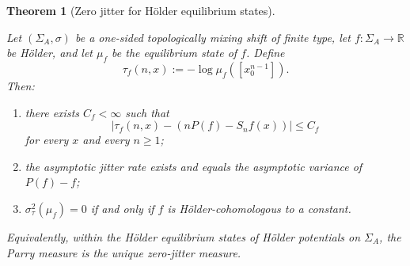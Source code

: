 \documentclass[pdflatex,sn-basic,Numbered]{sn-jnl}
\theoremstyle{thmstyleone}
\newtheorem{theorem}{Theorem}[section]
\theoremstyle{thmstyletwo}
\theoremstyle{thmstylethree}
\newcommand{\RR}{\mathbb{R}}
\newcommand{\leanverified}[1]{}
\begin{document}
\begin{theorem}[Zero jitter for H\"older equilibrium states]\label{thm:gibbs}
\leanverified{paper_zero_jitter_gibbs}
Let $(\Sigma_A,\sigma)$ be a one-sided topologically mixing shift of finite type, let $f:\Sigma_A\to\RR$ be H\"older, and let $\mu_f$ be the equilibrium state of $f$. Define
\[
\tau_f(n,x):=-\log\mu_f([x_0^{n-1}]).
\]
Then:
\begin{enumerate}[label=(\roman*),leftmargin=*,itemsep=2pt]
  \item there exists $C_f<\infty$ such that
  \[
  \bigl|\tau_f(n,x)-(nP(f)-S_nf(x))\bigr|\le C_f
  \]
  for every $x$ and every $n\ge 1$;
  \item the asymptotic jitter rate exists and equals the asymptotic variance of $P(f)-f$;
  \item $\sigma_\tau^2(\mu_f)=0$ if and only if $f$ is H\"older-cohomologous to a constant.
\end{enumerate}
Equivalently, within the H\"older equilibrium states of H\"older potentials on $\Sigma_A$, the Parry measure is the unique zero-jitter measure.
\end{theorem}
\end{document}
